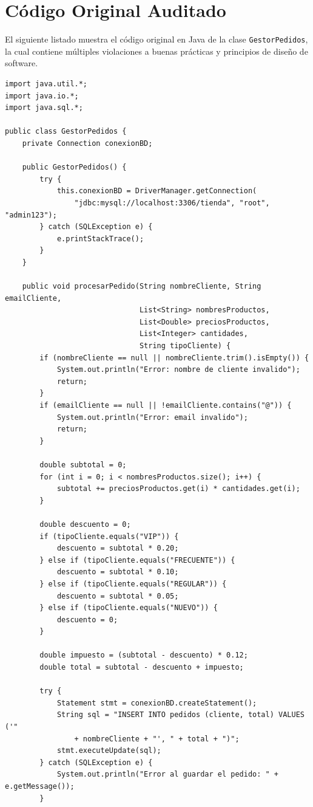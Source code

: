 \documentclass[12pt, a4paper]{article}
\begin{document}
\newpage
\section{Código Original Auditado}
El siguiente listado muestra el código original en Java de la clase \texttt{GestorPedidos}, la cual contiene múltiples violaciones a buenas prácticas y principios de diseño de software.

\begin{lstlisting}[caption={Código Java Original}, label={lst:original_code}]
import java.util.*;
import java.io.*;
import java.sql.*;

public class GestorPedidos {
    private Connection conexionBD;

    public GestorPedidos() {
        try {
            this.conexionBD = DriverManager.getConnection(
                "jdbc:mysql://localhost:3306/tienda", "root", "admin123");
        } catch (SQLException e) {
            e.printStackTrace();
        }
    }

    public void procesarPedido(String nombreCliente, String emailCliente,
                               List<String> nombresProductos,
                               List<Double> preciosProductos,
                               List<Integer> cantidades,
                               String tipoCliente) {
        if (nombreCliente == null || nombreCliente.trim().isEmpty()) {
            System.out.println("Error: nombre de cliente invalido");
            return;
        }
        if (emailCliente == null || !emailCliente.contains("@")) {
            System.out.println("Error: email invalido");
            return;
        }

        double subtotal = 0;
        for (int i = 0; i < nombresProductos.size(); i++) {
            subtotal += preciosProductos.get(i) * cantidades.get(i);
        }

        double descuento = 0;
        if (tipoCliente.equals("VIP")) {
            descuento = subtotal * 0.20;
        } else if (tipoCliente.equals("FRECUENTE")) {
            descuento = subtotal * 0.10;
        } else if (tipoCliente.equals("REGULAR")) {
            descuento = subtotal * 0.05;
        } else if (tipoCliente.equals("NUEVO")) {
            descuento = 0;
        }

        double impuesto = (subtotal - descuento) * 0.12;
        double total = subtotal - descuento + impuesto;

        try {
            Statement stmt = conexionBD.createStatement();
            String sql = "INSERT INTO pedidos (cliente, total) VALUES ('"
                + nombreCliente + "', " + total + ")";
            stmt.executeUpdate(sql);
        } catch (SQLException e) {
            System.out.println("Error al guardar el pedido: " + e.getMessage());
        }


\end{lstlisting}
\end{document}

